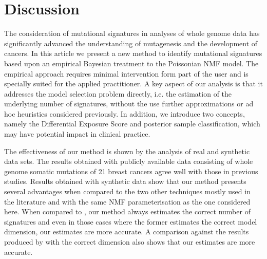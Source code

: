 \documentclass{bioinfo}
\begin{document}
\section{Discussion}
The consideration of mutational signatures in analyses of whole genome
data has significantly advanced the understanding of mutagenesis and
the development of cancers. In this article we present a new method to
identify mutational signatures based upon an empirical Bayesian
treatment to the Poissonian NMF model. The empirical approach requires
minimal intervention form part of the user and is specially suited for
the applied practitioner.  A key aspect of our analysis
is that it addresses the model selection problem directly,
i.e. the estimation of the underlying number of signatures, without
the use further approximations or ad hoc heuristics considered
previously. In addition, we introduce two concepts, namely the
Differential Exposure Score and posterior sample classification, which
may have potential impact in clinical practice.

The effectiveness of our method is shown by the analysis of real and
synthetic data sets. The results obtained with publicly available
data consisting of whole genome somatic mutations of 21 breast
cancers agree well with those in previous studies. Results obtained
with synthetic data show that our method presents several advantages
when compared to the two other techniques mostly used in the
literature and with the same NMF parameterisation as the one
considered here. When compared to \cite{FICMV}, our
method always estimates the correct number of signatures and even in
those cases where the former estimates the correct model dimension,
our estimates are more accurate. A comparison against the results
produced by \cite{A} with the correct dimension also shows that
our estimates are more accurate.
\end{document}
